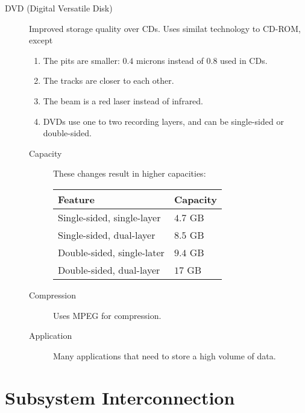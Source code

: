 \documentclass[../notes.tex]{subfiles}
\begin{document}
\begin{indentparagraph}
\begin{description}
\begin{description}
								\end{description}
							\pagebreak
							\item[DVD (Digital Versatile Disk)] Improved storage quality over CDs. Uses similat technology to CD-ROM, except
								\begin{enumerate}[label=\alph*, nosep]
									\item The pits are smaller: $0.4$ microns instead of $0.8$ used in CDs.
									\item The tracks are closer to each other.
									\item The beam is a red laser instead of infrared.
									\item DVDs use one to two recording layers, and can be single-sided or double-sided.
								\end{enumerate}
								\begin{description}
									\item[Capacity] These changes result in higher capacities:
										\begin{center}
											\begin{tabular}{ll}
												Feature & Capacity\\
												\midrule
												Single-sided, single-layer & $4.7$ GB\\
												Single-sided, dual-layer & $8.5$ GB\\
												Double-sided, single-later & $9.4$ GB\\
												Double-sided, dual-layer & $17$ GB
											\end{tabular}
										\end{center}
									\item[Compression] Uses MPEG for compression.
									\item[Application] Many applications that need to store a high volume of data.
								\end{description}
						\end{description}
					\end{indentparagraph}
		\section{Subsystem Interconnection}
\end{document}
